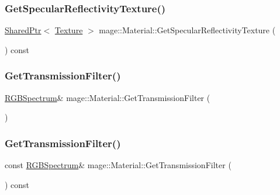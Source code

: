 \hypertarget{structmage_1_1_material_a7ed5469af2440a4fc1db498c24f06764}{}\label{structmage_1_1_material_a7ed5469af2440a4fc1db498c24f06764} 
\subsubsection{\texorpdfstring{Get\+Specular\+Reflectivity\+Texture()}{GetSpecularReflectivityTexture()}}
{\footnotesize\ttfamily \hyperlink{namespacemage_a1e01ae66713838a7a67d30e44c67703e}{Shared\+Ptr}$<$ \hyperlink{classmage_1_1_texture}{Texture} $>$ mage\+::\+Material\+::\+Get\+Specular\+Reflectivity\+Texture (\begin{DoxyParamCaption}{ }\end{DoxyParamCaption}) const\hspace{0.3cm}{\ttfamily [noexcept]}}

\hypertarget{structmage_1_1_material_aba949cb74176530638c7bcb100882196}{}\label{structmage_1_1_material_aba949cb74176530638c7bcb100882196} 
\subsubsection{\texorpdfstring{Get\+Transmission\+Filter()}{GetTransmissionFilter()}\hspace{0.1cm}{\footnotesize\ttfamily [1/2]}}
{\footnotesize\ttfamily \hyperlink{structmage_1_1_r_g_b_spectrum}{R\+G\+B\+Spectrum}\& mage\+::\+Material\+::\+Get\+Transmission\+Filter (\begin{DoxyParamCaption}{ }\end{DoxyParamCaption})\hspace{0.3cm}{\ttfamily [noexcept]}}

\hypertarget{structmage_1_1_material_a38071483e6d47eedb02b2e5c912073e7}{}\label{structmage_1_1_material_a38071483e6d47eedb02b2e5c912073e7} 
\subsubsection{\texorpdfstring{Get\+Transmission\+Filter()}{GetTransmissionFilter()}\hspace{0.1cm}{\footnotesize\ttfamily [2/2]}}
{\footnotesize\ttfamily const \hyperlink{structmage_1_1_r_g_b_spectrum}{R\+G\+B\+Spectrum}\& mage\+::\+Material\+::\+Get\+Transmission\+Filter (\begin{DoxyParamCaption}{ }\end{DoxyParamCaption}) const\hspace{0.3cm}{\ttfamily [noexcept]}}


